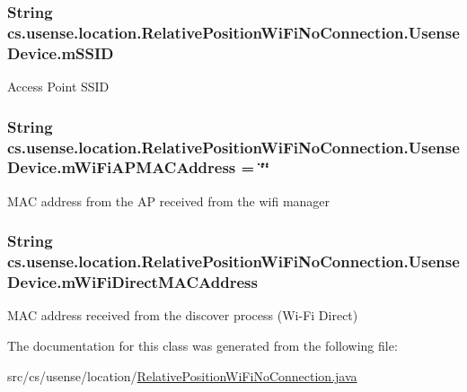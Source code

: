 \subsubsection[{m\+S\+S\+I\+D}]{\setlength{\rightskip}{0pt plus 5cm}String cs.\+usense.\+location.\+Relative\+Position\+Wi\+Fi\+No\+Connection.\+Usense\+Device.\+m\+S\+S\+I\+D}\label{classcs_1_1usense_1_1location_1_1_relative_position_wi_fi_no_connection_1_1_usense_device_ac2ce75dfa49d63e67451e02d13e86de9}
Access Point S\+S\+I\+D \hypertarget{classcs_1_1usense_1_1location_1_1_relative_position_wi_fi_no_connection_1_1_usense_device_a47ea636fbb53413cc89ea02cb4a3b327}{}
\subsubsection[{m\+Wi\+Fi\+A\+P\+M\+A\+C\+Address}]{\setlength{\rightskip}{0pt plus 5cm}String cs.\+usense.\+location.\+Relative\+Position\+Wi\+Fi\+No\+Connection.\+Usense\+Device.\+m\+Wi\+Fi\+A\+P\+M\+A\+C\+Address = \char`\"{}\char`\"{}}\label{classcs_1_1usense_1_1location_1_1_relative_position_wi_fi_no_connection_1_1_usense_device_a47ea636fbb53413cc89ea02cb4a3b327}
M\+A\+C address from the A\+P received from the wifi manager \hypertarget{classcs_1_1usense_1_1location_1_1_relative_position_wi_fi_no_connection_1_1_usense_device_a1f976f414772190a1ff3d33b49f66769}{}
\subsubsection[{m\+Wi\+Fi\+Direct\+M\+A\+C\+Address}]{\setlength{\rightskip}{0pt plus 5cm}String cs.\+usense.\+location.\+Relative\+Position\+Wi\+Fi\+No\+Connection.\+Usense\+Device.\+m\+Wi\+Fi\+Direct\+M\+A\+C\+Address}\label{classcs_1_1usense_1_1location_1_1_relative_position_wi_fi_no_connection_1_1_usense_device_a1f976f414772190a1ff3d33b49f66769}
M\+A\+C address received from the discover process (Wi-\/\+Fi Direct) 

The documentation for this class was generated from the following file\+:\begin{DoxyCompactItemize}
\item 
src/cs/usense/location/\hyperlink{_relative_position_wi_fi_no_connection_8java}{Relative\+Position\+Wi\+Fi\+No\+Connection.\+java}\end{DoxyCompactItemize}

